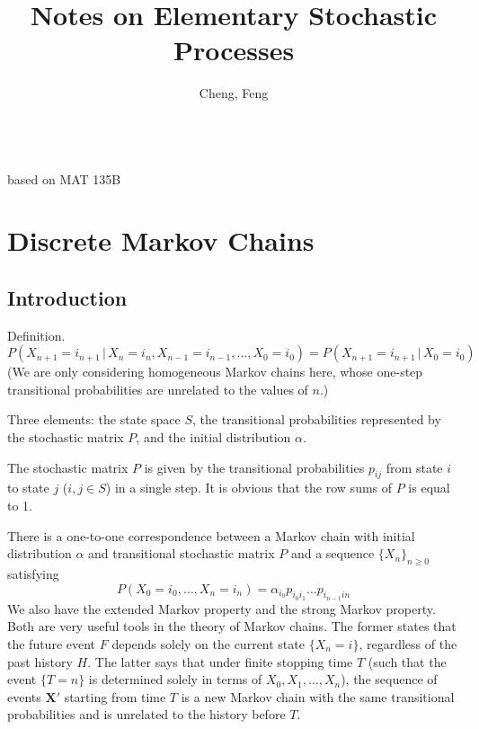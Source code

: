 \documentclass[11pt]{article}
\title{Notes on Elementary Stochastic Processes}
\author{Cheng, Feng}
\newcommand{\where}{\,|\,}
\begin{document}
\makeatletter
\begin{center}
    {\Large \@title} \\ based on MAT 135B
    \vspace{0.5em}
    \\ \@author
    \vspace{-0.5em}
\end{center}
\makeatother



\setcounter{secnumdepth}{0}

\section{Discrete Markov Chains}

\subsection{Introduction}
Definition.
\[
P(X_{n+1}=i_{n+1} \where X_{n}=i_{n},X_{n- 1}=i_{n- 1},\dots ,X_{0}=i_{0})=P(X_{n+1}=i_{n+1} \where X_{0}=i_{0})
\]
(We are only considering homogeneous Markov chains here, whose one-step transitional probabilities are unrelated to the values of $n$.)

Three elements: the state space $S$, the transitional probabilities represented by the stochastic matrix $P$, and the initial distribution $\alpha $.

The stochastic matrix $P$ is given by the transitional probabilities $p_{ij}$ from state $i$ to state $j$ ($i,j\in S$) in a single step. It is obvious that the row sums of $P$ is equal to 1.

There is a one-to-one correspondence between a Markov chain with initial distribution $\alpha $ and transitional stochastic matrix $P$ and a sequence $\{X_{n}\}_{n\geq 0}$ satisfying
\[
P(X_{0}=i_{0},\dots ,X_{n}=i_{n})=\alpha _{i_{0}}p_{i_{0}i_{1}}\dots p_{i_{n- 1}in}
\]
We also have the extended Markov property and the strong Markov property. Both are very useful tools in the theory of Markov chains.
The former states that the future event $F$ depends solely on the current state $\{X_{n}=i\}$, regardless of the past history $H$.
The latter says that under finite stopping time $T$ (such that the event $\{T=n\}$ is determined solely in terms of $X_{0},X_{1},\dots ,X_{n}$), the sequence of events $\mathbf{X' }$ starting from time $T$ is a new Markov chain with the same transitional probabilities and is unrelated to the history before $T$.
\end{document}
